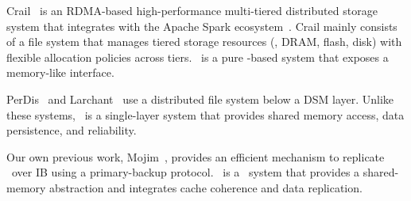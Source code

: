 Crail~\cite{crail} is an RDMA-based high-performance multi-tiered distributed storage system that integrates with the Apache Spark ecosystem~\cite{Zaharia12-NSDI}.
Crail mainly consists of a file system that manages tiered storage resources (\eg, DRAM, flash, disk) 
with flexible allocation policies across tiers.
\hotpot\ is a pure \nvm-based system that exposes a memory-like interface. 

PerDis~\cite{PerDis} and Larchant~\cite{Larchant,Larchant94} use a distributed file system below a DSM layer.
Unlike these systems, \hotpot\ is a single-layer system that provides shared memory access, data persistence, and reliability.


Our own previous work, Mojim~\cite{Zhang15-Mojim}, provides an efficient mechanism to replicate \nvm\
over IB using a primary-backup protocol.
\hotpot\ is a \dsnvm\ system that provides a shared-memory abstraction
and integrates cache coherence and data replication.
